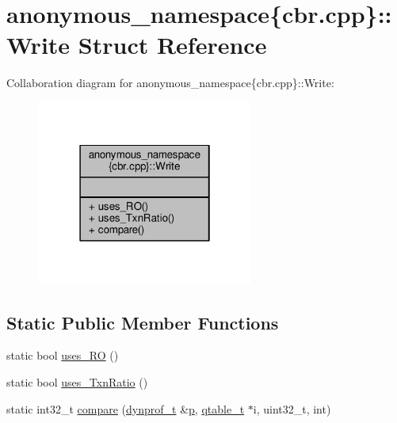 \hypertarget{structanonymous__namespace_02cbr_8cpp_03_1_1Write}{\section{anonymous\-\_\-namespace\{cbr.\-cpp\}\-:\-:Write Struct Reference}
\label{structanonymous__namespace_02cbr_8cpp_03_1_1Write}
}


Collaboration diagram for anonymous\-\_\-namespace\{cbr.\-cpp\}\-:\-:Write\-:
\nopagebreak
\begin{figure}[H]
\begin{center}
\leavevmode
\includegraphics[width=202pt]{structanonymous__namespace_02cbr_8cpp_03_1_1Write__coll__graph}
\end{center}
\end{figure}
\subsection*{Static Public Member Functions}
\begin{DoxyCompactItemize}
\item 
static bool \hyperlink{structanonymous__namespace_02cbr_8cpp_03_1_1Write_ae282683ca891bc88a526ace4f86eab12}{uses\-\_\-\-R\-O} ()
\item 
static bool \hyperlink{structanonymous__namespace_02cbr_8cpp_03_1_1Write_a59d0863867c8bc590b4c15757c42dd8d}{uses\-\_\-\-Txn\-Ratio} ()
\item 
static int32\-\_\-t \hyperlink{structanonymous__namespace_02cbr_8cpp_03_1_1Write_a38d55a0bb94adf67009ffa4daec111be}{compare} (\hyperlink{structstm_1_1dynprof__t}{dynprof\-\_\-t} \&\hyperlink{counted__ptr_8hpp_a5c9f59d7c24e3fd6ceae319a968fc3e0}{p}, \hyperlink{structstm_1_1qtable__t}{qtable\-\_\-t} $\ast$i, uint32\-\_\-t, int)
\end{DoxyCompactItemize}


